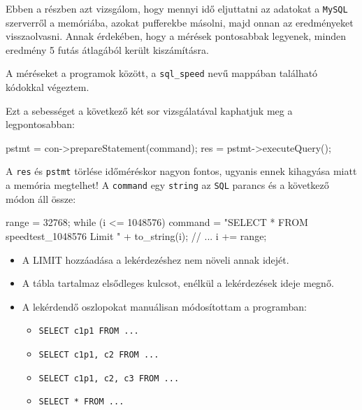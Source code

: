 


Ebben a részben azt vizsgálom, hogy mennyi idő eljuttatni az adatokat a \texttt{MySQL} szerverről a memóriába, azokat pufferekbe másolni, majd onnan az eredményeket visszaolvasni.
Annak érdekében, hogy a mérések pontosabbak legyenek, minden eredmény 5 futás átlagából került kiszámításra.


A méréseket a programok között, a \texttt{sql\_speed} nevű mappában található kódokkal végeztem.

Ezt a sebességet a következő két sor vizsgálatával kaphatjuk meg a legpontosabban:
\begin{python}
pstmt = con->prepareStatement(command);
res = pstmt->executeQuery();
\end{python}
A  \texttt{res} és \texttt{pstmt} törlése időméréskor nagyon fontos, ugyanis ennek kihagyása miatt a memória megtelhet!
A \texttt{command} egy \texttt{string} az \texttt{SQL} parancs és a következő módon áll össze:
\begin{python}
range = 32768;
while (i <= 1048576)
{
   command = "SELECT * FROM speedtest_1048576 Limit " + to_string(i);
   // ...
   i += range;
}
\end{python}
\begin{itemize}
\item A LIMIT hozzáadása a lekérdezéshez nem növeli annak idejét.
\item A tábla tartalmaz elsődleges kulcsot, enélkül a lekérdezések ideje megnő.
\item A lekérdendő oszlopokat manuálisan módosítottam a programban: 
\begin{itemize} 
\item \texttt{SELECT c1p1 FROM ...}
\item \texttt{SELECT c1p1, c2 FROM ...} 
\item \texttt{SELECT c1p1, c2, c3 FROM ...} 
\item \texttt{SELECT * FROM ...} 
\end{itemize}
\end{itemize}

